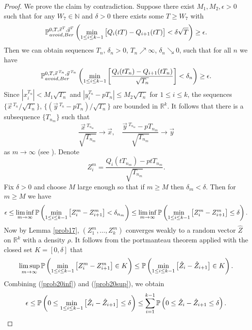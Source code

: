 \begin{proof}
	We prove the claim by contradiction. Suppose there exist $M_1,M_2,\epsilon>0$ such that for any $W_7\in \mathbb{N}$ and $\delta>0$ there exists some $T\geq W_7$ with
	\[
	\mathbb{P}^{0,T,\vec x^T,\vec y^T}_{avoid, Ber}\left(\min_{1\leq i\leq k-1}\big[Q_i(tT)-Q_{i+1}(tT)\big]<\delta\sqrt{T}\right)\geq \epsilon.
	\]
	Then we can obtain sequences $T_n$, $\delta_n>0$, $T_n \nearrow \infty$, $\delta_n \searrow 0$, such that for all $n$ we have  
	\[
	\mathbb{P}^{0,T,\vec x\,^{T_n},\vec y\,^{T_n}}_{avoid, Ber}\left(\min_{1\leq i\leq k-1}\left[\frac{Q_i(tT_n)-Q_{i+1}(tT_n)}{\sqrt{T_n}}\right]<\delta_n\right)\geq \epsilon.
	\]
	Since $|x_i^{T_n}|<M_1\sqrt{T_n}$ and $|y_i^{T_n}-pT_n|\leq M_2\sqrt{T_n}$ for $1\leq i\leq k$, the sequences $\{\vec{x}\,^{T_n}/\sqrt{T_n}\}$, $\{(\vec{y}\,^{T_n}-pT_n)/\sqrt{T_n}\}$ are bounded in $\mathbb{R}^k$. It follows that there is a subsequence $\{T_{n_m}\}$ such that \[
	\frac{\vec{x}\,^{T_{n_m}}}{\sqrt{T_{n_m}}} \longrightarrow \vec x, \quad
	\frac{\vec{y}\,^{T_{n_m}}-pT_{n_m}}{\sqrt{T_{n_m}}} \longrightarrow \vec y
	\] 
	as $m\to\infty$ (see \cite[Theorem 3.6]{Rudin}). Denote $$Z_i^m =\frac{Q_i(tT_{n_m})-ptT_{n_m}}{\sqrt{T_{n_m}}}.$$ Fix $\delta > 0$ and choose $M$ large enough so that if $m\geq M$ then $\delta_m < \delta$. Then for $m\geq M$ we have
	\begin{equation}\label{prob20inf}
	\epsilon\leq \liminf_{m\to\infty}\mathbb{P}\left(\min_{1\leq i\leq k-1} \big[Z_i^m-Z_{i+1}^m\big] < \delta_{n_m}\right) \leq \liminf_{m\to\infty}\mathbb{P}\left(\min_{1\leq i\leq k-1} \big[ Z_i^m-Z_{i+1}^m\big] \leq\delta\right).
	\end{equation}
	Now by Lemma \ref{prob17}, $(Z_1^m,\dots, Z_k^m)$ converges weakly to a random vector $\hat Z$ on $\mathbb{R}^k$ with a density $\rho$. It follows from the portmanteau theorem \cite[Theorem 3.2.11]{Durrett} applied with the closed set $K=[0,\delta]$ that
	\begin{equation}\label{prob20sup}
	\limsup_{m\to\infty }\mathbb{P}\left(\min_{1\leq i\leq k-1} \big[Z_i^m-Z_{i+1}^m\big]\in K\right)\leq \mathbb{P}\left(\min_{1\leq i\leq k-1} \big[\hat Z_i-\hat Z_{i+1}\big]\in K\right).
	\end{equation}
	Combining (\ref{prob20inf}) and (\ref{prob20sup}), we obtain
	\begin{equation}\label{eq:ineq}
	\epsilon\leq \mathbb{P}\left(0 \leq \min_{1\leq i\leq k-1} \big[\hat Z_i-\hat Z_{i+1}\big]\leq\delta\right)\leq \sum_{i=1}^{k-1}\mathbb{P}\left(0 \leq \hat Z_i-\hat Z_{i+1}\leq \delta\right).
	\end{equation}

\end{proof}
